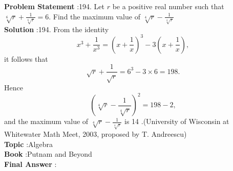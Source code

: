 \documentclass[10pt]{article}
\begin{document}
\textbf{Problem Statement} :194. Let $r$ be a positive real number such that $\sqrt[6]{r}+\frac{1}{\sqrt[6]{r}}=6$. Find the maximum value of $\sqrt[4]{r}-\frac{1}{\sqrt[4]{r}}$\\
\textbf{Solution} :194. From the identity$$ x^{3}+\frac{1}{x^{3}}=\left(x+\frac{1}{x}\right)^{3}-3\left(x+\frac{1}{x}\right), $$it follows that$$ \sqrt{r}+\frac{1}{\sqrt{r}}=6^{3}-3 \times 6=198 . $$Hence$$ \left(\sqrt[4]{r}-\frac{1}{\sqrt[4]{r}}\right)^{2}=198-2, $$and the maximum value of $\sqrt[4]{r}-\frac{1}{\sqrt[4]{r}}$ is 14 .(University of Wisconsin at Whitewater Math Meet, 2003, proposed by T. Andreescu)\\
\textbf{Topic} :Algebra\\
\textbf{Book} :Putnam and Beyond\\
\textbf{Final Answer} :\\
\end{document}
